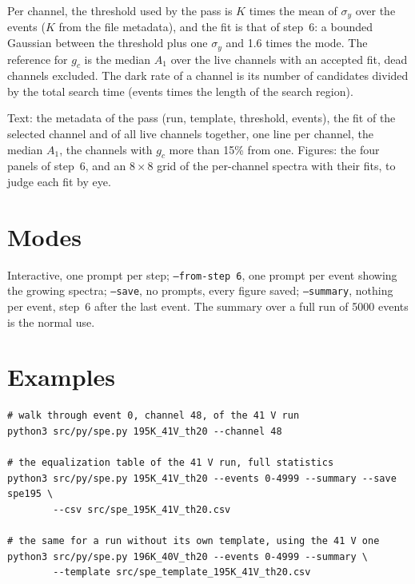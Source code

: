 \documentclass[11pt]{article}
\newcommand{\code}[1]{\texttt{#1}}
\begin{document}
Per channel, the threshold used by the pass is $K$ times the mean of
$\sigma_y$ over the events ($K$ from the file metadata), and the fit is
that of step~6: a bounded Gaussian between the threshold plus one
$\sigma_y$ and 1.6 times the mode. The reference for $g_c$ is the median
$A_1$ over the live channels with an accepted fit, dead channels
excluded. The dark rate of a channel is its number of candidates divided
by the total search time (events times the length of the search region).

Text: the metadata of the pass (run, template, threshold, events), the
fit of the selected channel and of all live channels together, one line
per channel, the median $A_1$, the channels with $g_c$ more than 15\% from
one. Figures: the four panels of step~6, and an $8\times8$ grid of the
per-channel spectra with their fits, to judge each fit by eye.

\section{Modes}

Interactive, one prompt per step; \code{--from-step 6}, one prompt per
event showing the growing spectra; \code{--save}, no prompts, every
figure saved; \code{--summary}, nothing per event, step~6 after the last
event. The summary over a full run of 5000 events is the normal use.

\section{Examples}

\begin{lstlisting}
# walk through event 0, channel 48, of the 41 V run
python3 src/py/spe.py 195K_41V_th20 --channel 48

# the equalization table of the 41 V run, full statistics
python3 src/py/spe.py 195K_41V_th20 --events 0-4999 --summary --save spe195 \
        --csv src/spe_195K_41V_th20.csv

# the same for a run without its own template, using the 41 V one
python3 src/py/spe.py 196K_40V_th20 --events 0-4999 --summary \
        --template src/spe_template_195K_41V_th20.csv
\end{lstlisting}
\end{document}
